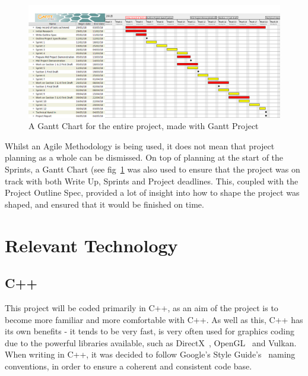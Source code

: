 \documentclass[a4paper,10pt]{report}
\begin{document}
\begin{figure}[h!]
    \centering
  \includegraphics[width=1\textwidth]{Images/Charts/GanttChart.png}
 \caption{A Gantt Chart for the entire project, made with Gantt Project~\cite{gantt}}
 \label{fig:gantt_chart}
\end{figure}


Whilst an Agile Methodology is being used, it does not mean that project planning as a whole can be dismissed. On top of planning at the start of the Sprints, a Gantt Chart (see fig~\ref{fig:gantt_chart} was also used to ensure that the project was on track with both Write Up, Sprints and Project deadlines. This, coupled with the Project Outline Spec, provided a lot of insight into how to shape the project was shaped, and ensured that it would be finished on time. \medskip


\section{Relevant Technology}

\subsection{C++}

This project will be coded primarily in C++, as an aim of the project is to become more familiar and more comfortable with C++. As well as this, C++ has its own benefits - it tends to be very fast, is very often used for graphics coding due to the powerful libraries available, such as DirectX~\cite{directx_website}, OpenGL~\cite{OpenGL_website} and Vulkan. When writing in C++, it was decided to follow Google's Style Guide's~\cite{google_c_style_guide} naming conventions, in order to ensure a coherent and consistent code base.
\end{document}

